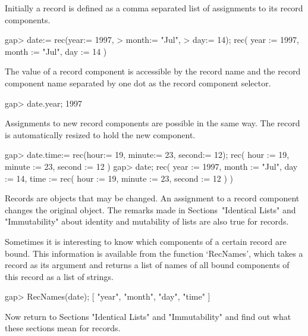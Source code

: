 Initially a record is defined as a comma separated list of assignments to
its record components.

\beginexample
gap> date:= rec(year:= 1997,
>               month:= "Jul",
>               day:= 14);
rec(
  year := 1997,
  month := "Jul",
  day := 14 )
\endexample

The value of a record component is accessible by  the record name and the
record  component name separated   by one dot   as  the record  component
selector.

\beginexample
gap> date.year;
1997
\endexample

Assignments to new record components  are possible in  the same way.  The
record is automatically resized to hold the new component.

\beginexample
gap> date.time:= rec(hour:= 19, minute:= 23, second:= 12);
rec(
  hour := 19,
  minute := 23,
  second := 12 )
gap> date;
rec(
  year := 1997,
  month := "Jul",
  day := 14,
  time := rec(
      hour := 19,
      minute := 23,
      second := 12 ) )
\endexample

Records are objects  that  may be  changed.   An assignment to  a  record
component  changes the original  object.
The remarks made in Sections~"Identical Lists" and "Immutability"
about identity and mutability of lists are also true for records.

Sometimes it is interesting to know which  components of a certain record
are  bound.  This information is available  from the function `RecNames',
which  takes a record as  its  argument and  returns  a list of names of
all bound components of this record as a list of strings.

\beginexample
gap> RecNames(date);
[ "year", "month", "day", "time" ]
\endexample

%

Now return to Sections "Identical Lists"  and "Immutability" and find out
what these sections mean for records.

\null

